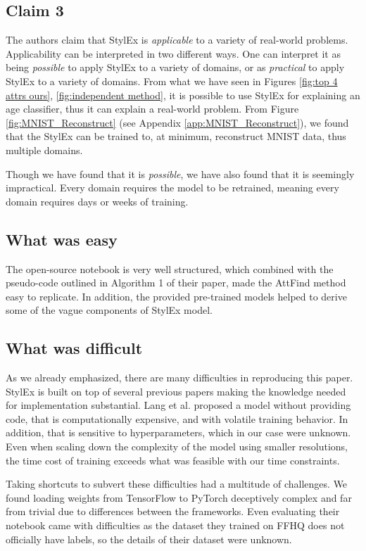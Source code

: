\subsection{Claim 3}

The authors claim that StylEx is \textit{applicable} to a variety of real-world problems. Applicability can be interpreted in two different ways. One can interpret it as being \textit{possible} to apply StylEx to a variety of domains, or as \textit{practical} to apply StylEx to a variety of domains. From what we have seen in Figures \ref{fig:top 4 attrs ours}, \ref{fig:independent method}, it is possible to use StylEx for explaining an age classifier, thus it can explain a real-world problem. From Figure \ref{fig:MNIST_Reconstruct} (see Appendix \ref{app:MNIST_Reconstruct}), we found that the StylEx can be trained to, at minimum, reconstruct MNIST data, thus multiple domains.

Though we have found that it is \textit{possible}, we have also found that it is seemingly impractical. Every domain requires the model to be retrained, meaning every domain requires days or weeks of training.

\subsection{What was easy}
The open-source notebook is very well structured, which combined with the pseudo-code outlined in Algorithm 1 of their paper, made the AttFind method easy to replicate. In addition, the provided pre-trained models helped to derive some of the vague components of StylEx model.

\subsection{What was difficult}
As we already emphasized, there are many difficulties in reproducing this paper. StylEx is built on top of several previous papers making the knowledge needed for implementation substantial. Lang et al. proposed a model without providing code, that is computationally expensive, and with volatile training behavior. In addition, that is sensitive to hyperparameters, which in our case were unknown.  Even when scaling down the complexity of the model using smaller resolutions, the time cost of training exceeds what was feasible with our time constraints.

Taking shortcuts to subvert these difficulties had a multitude of challenges. We found loading weights from TensorFlow to PyTorch deceptively complex and far from trivial due to differences between the frameworks. Even evaluating their notebook came with difficulties as the dataset they trained on FFHQ does not officially have labels, so the details of their dataset were unknown.


